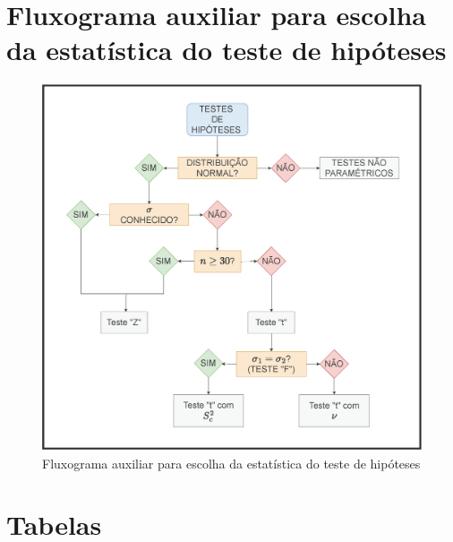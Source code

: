 \documentclass[
]{book}
\begin{document}
\hfill\break

\hypertarget{fluxograma-auxiliar-para-escolha-da-estatuxedstica-do-teste-de-hipuxf3teses}{%
\section{Fluxograma auxiliar para escolha da estatística do teste de hipóteses}\label{fluxograma-auxiliar-para-escolha-da-estatuxedstica-do-teste-de-hipuxf3teses}}

\begin{figure}

{\centering \includegraphics[width=0.8\linewidth]{images11/esquema_teste_hipoteses} 

}

\caption{Fluxograma auxiliar para escolha da estatística do teste de hipóteses}\label{fig:unnamed-chunk-139}
\end{figure}

\hfill\break

\hypertarget{tabelas-1}{%
\section{Tabelas}\label{tabelas-1}}
\end{document}
